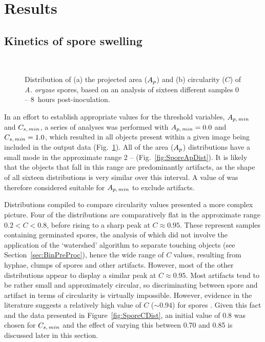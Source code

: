 \section{Results}

\subsection{Kinetics of spore swelling}\label{sec:KinSporeSwell}

\begin{figure}[htbp]
	\centering
	\captionsetup[subfloat]{position=top}
	\\
	\caption{Distribution of (a) the projected area ($A_p$) and (b) circularity ($C$) of \emph{A. oryzae} spores, based on an analysis of sixteen different samples 0 -- 8~hours post-inoculation.}
	\label{fig:SporeDist}
\end{figure}

In an effort to establish appropriate values for the threshold variables, $A_{p,\,min}$ and $C_{s,\,min}$, a series of analyses was performed with $A_{p,\,min} = 0.0$ and $C_{s,\,min} = 1.0$, which resulted in all objects present within a given image being included in the output data (Fig.~\ref{fig:SporeDist}). All of the area ($A_p$) distributions have a small mode in the approximate range 2 --  (Fig.~\ref{fig:SporeApDist}). It is likely that the objects that fall in this range are predominantly artifacts, as the shape of all sixteen distributions is very similar over this interval. A value of  was therefore considered suitable for $A_{p,\,min}$ to exclude artifacts.

Distributions compiled to compare circularity values presented a more complex picture. Four of the distributions are comparatively flat in the approximate range $0.2 < C < 0.8$, before rising to a sharp peak at $C \approx 0.95$. These represent samples containing germinated spores, the analysis of which did not involve the application of the \lq watershed' algorithm to separate touching objects (see Section~\ref{sec:BinPreProc}), hence the wide range of $C$ values, resulting from hyphae, clumps of spores and other artifacts. However, most of the other distributions appear to display a similar peak at $C \approx 0.95$. Most artifacts tend to be rather small and approximately circular, so discriminating between spore and artifact in terms of circularity is virtually impossible. However, evidence in the literature suggests a relatively high value of $C$ ($\sim 0.94$) for spores \cite{spohr1998}. Given this fact and the data presented in Figure~\ref{fig:SporeCDist}, an initial value of 0.8 was chosen for $C_{s,\,min}$ and the effect of varying this between 0.70 and 0.85 is discussed later in this section.

